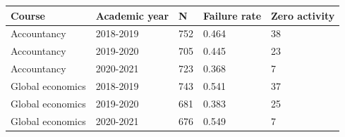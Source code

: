 \begin{tabular}{lllll}
\toprule
Course & Academic year & N & Failure rate & Zero activity\\
\midrule
Accountancy & 2018-2019 & 752 & 0.464 & 38\\
Accountancy & 2019-2020 & 705 & 0.445 & 23\\
Accountancy & 2020-2021 & 723 & 0.368 & 7\\
Global economics & 2018-2019 & 743 & 0.541 & 37\\
Global economics & 2019-2020 & 681 & 0.383 & 25\\
Global economics & 2020-2021 & 676 & 0.549 & 7\\
\bottomrule
\end{tabular}